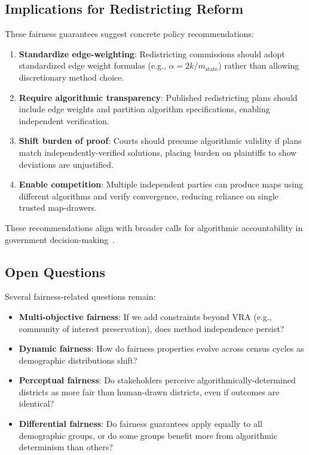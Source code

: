 \subsection{Implications for Redistricting Reform}

These fairness guarantees suggest concrete policy recommendations:

\begin{enumerate}
    \item \textbf{Standardize edge-weighting}: Redistricting commissions should adopt standardized edge weight formulas (e.g., $\alpha = 2k / m_{\text{state}}$) rather than allowing discretionary method choice.

    \item \textbf{Require algorithmic transparency}: Published redistricting plans should include edge weights and partition algorithm specifications, enabling independent verification.

    \item \textbf{Shift burden of proof}: Courts should presume algorithmic validity if plans match independently-verified solutions, placing burden on plaintiffs to show deviations are unjustified.

    \item \textbf{Enable competition}: Multiple independent parties can produce maps using different algorithms and verify convergence, reducing reliance on single trusted map-drawers.
\end{enumerate}

These recommendations align with broader calls for algorithmic accountability in government decision-making~\cite{kroll2017accountable,citron2008technological,brauneis2018algorithmic}.

\subsection{Open Questions}

Several fairness-related questions remain:

\begin{itemize}
    \item \textbf{Multi-objective fairness}: If we add constraints beyond VRA (e.g., community of interest preservation), does method independence persist?

    \item \textbf{Dynamic fairness}: How do fairness properties evolve across census cycles as demographic distributions shift?

    \item \textbf{Perceptual fairness}: Do stakeholders perceive algorithmically-determined districts as more fair than human-drawn districts, even if outcomes are identical?

    \item \textbf{Differential fairness}: Do fairness guarantees apply equally to all demographic groups, or do some groups benefit more from algorithmic determinism than others?
\end{itemize}

